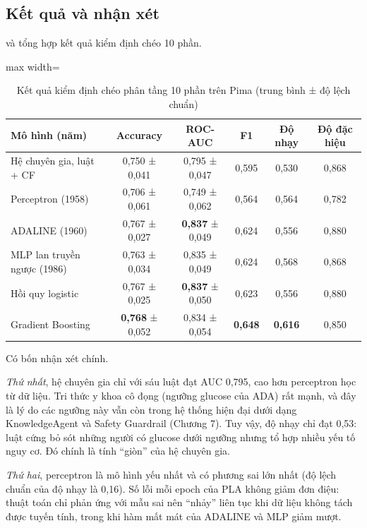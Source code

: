 \subsection{Kết quả và nhận xét}

 và  tổng hợp kết quả kiểm định chéo 10 phần.

\begin{table}[H]
\centering
\caption{Kết quả kiểm định chéo phân tầng 10 phần trên Pima (trung bình ± độ lệch chuẩn)}
\label{tab:ch1-results}
\small
\begin{adjustbox}{max width=\linewidth}
\begin{tabular}{@{}lccccc@{}}
\toprule
\textbf{Mô hình (năm)} & \textbf{Accuracy} & \textbf{ROC-AUC} & \textbf{F1} & \textbf{Độ nhạy} & \textbf{Độ đặc hiệu} \\
\midrule
Hệ chuyên gia, luật + CF & 0,750 ± 0,041 & 0,795 ± 0,047 & 0,595 & 0,530 & 0,868 \\
Perceptron (1958) & 0,706 ± 0,061 & 0,749 ± 0,062 & 0,564 & 0,564 & 0,782 \\
ADALINE (1960) & 0,767 ± 0,027 & \textbf{0,837} ± 0,049 & 0,624 & 0,556 & 0,880 \\
MLP lan truyền ngược (1986) & 0,763 ± 0,034 & 0,835 ± 0,049 & 0,624 & 0,568 & 0,868 \\
Hồi quy logistic & 0,767 ± 0,025 & \textbf{0,837} ± 0,050 & 0,623 & 0,556 & 0,880 \\
Gradient Boosting & \textbf{0,768} ± 0,052 & 0,834 ± 0,054 & \textbf{0,648} & \textbf{0,616} & 0,850 \\
\bottomrule
\end{tabular}
\end{adjustbox}
\end{table}



Có bốn nhận xét chính.

\emph{Thứ nhất}, hệ chuyên gia chỉ với sáu luật đạt AUC 0,795, cao hơn perceptron học từ dữ liệu. Tri thức y khoa cô đọng (ngưỡng glucose của ADA) rất mạnh, và đây là lý do các ngưỡng này vẫn còn trong hệ thống hiện đại dưới dạng KnowledgeAgent và Safety Guardrail (Chương 7). Tuy vậy, độ nhạy chỉ đạt 0,53: luật cứng bỏ sót những người có glucose dưới ngưỡng nhưng tổ hợp nhiều yếu tố nguy cơ. Đó chính là tính ``giòn'' của hệ chuyên gia.

\emph{Thứ hai}, perceptron là mô hình yếu nhất và có phương sai lớn nhất (độ lệch chuẩn của độ nhạy là 0,16). Số lỗi mỗi epoch của PLA không giảm đơn điệu: thuật toán chỉ phản ứng với mẫu sai nên ``nhảy'' liên tục khi dữ liệu không tách được tuyến tính, trong khi hàm mất mát của ADALINE và MLP giảm mượt.

